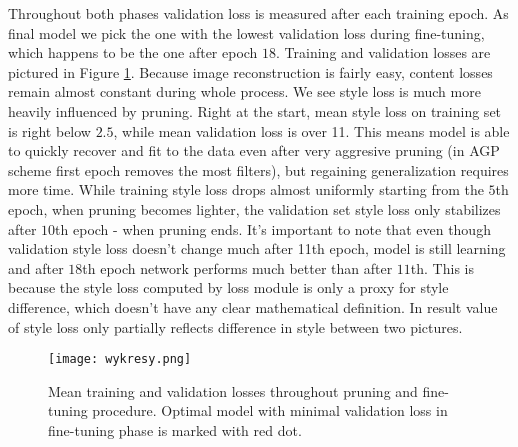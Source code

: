 \documentclass[../Main.tex]{subfiles}
\begin{document}
    Throughout both phases validation loss is measured after each training epoch.
    As final model we pick the one with the lowest validation loss during fine-tuning, 
    which happens to be the one after epoch $18$. Training and validation losses are 
    pictured in Figure \ref{fig:wykresy}. Because image reconstruction is fairly 
    easy, content losses remain almost constant during whole process. We see style 
    loss is much more heavily influenced by pruning. Right at the start, mean style loss 
    on training set is right below $2.5$, while mean validation loss is over 11. This means 
    model is able to quickly recover and fit to the data even after very aggresive pruning 
    (in AGP scheme first epoch removes the most filters), but regaining generalization requires more
    time. While training style loss drops almost uniformly starting from the $5$th epoch, 
    when pruning becomes lighter, the validation set style loss only stabilizes after $10$th epoch - 
    when pruning ends. It's important to note that even though validation style loss 
    doesn't change much after 11th epoch, model is still learning and after $18$th
    epoch network performs much better than after $11$th. This is because the style loss 
    computed by loss module is only a proxy for style difference, which doesn't have 
    any clear mathematical definition. In result value of style loss only partially reflects
    difference in style between two pictures. 
    
    \begin{center}
     \begin{figure}[h!]
            \texttt{[image: wykresy.png]}
            \caption{Mean training and validation losses throughout pruning and fine-tuning
            procedure. Optimal model with minimal validation loss in fine-tuning phase 
            is marked with red dot.
            }
        \label{fig:wykresy}
    \end{figure}
    \end{center}
    




\biblio %
\end{document}
